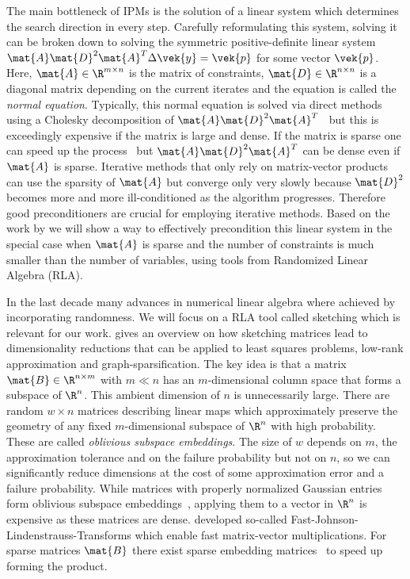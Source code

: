 The main bottleneck of IPMs is the solution of a linear system which determines the search direction in every step.
Carefully reformulating this system, solving it can be broken down to solving the symmetric positive-definite linear system \(\mat{A} \mat{D}^2 \mat{A}^T \Delta \vek{y} = \vek{p}\) for some vector \(\vek{p}\).
Here, \(\mat{A} \in \R^{m \times n}\) is the matrix of constraints, \(\mat{D} \in \R^{n \times n}\) is a diagonal matrix depending on the current iterates and the equation is called the \emph{normal equation}.
Typically, this normal equation is solved via direct methods using a Cholesky decomposition of \(\mat{A} \mat{D}^2 \mat{A}^T\)~\cite[p. 17]{Wright-PrimalDualInteriorPointMethods} but this is exceedingly expensive if the matrix is large and dense.
If the matrix is sparse one can speed up the process~\cite{NgPeyton-SparseCholesky} but \(\mat{A} \mat{D}^2 \mat{A}^T\) can be dense even if \(\mat{A}\) is sparse.
Iterative methods that only rely on matrix-vector products can use the sparsity of \(\mat{A}\) but converge only very slowly because \(\mat{D}^2\) becomes more and more ill-conditioned as the algorithm progresses.
Therefore good preconditioners are crucial for employing iterative methods.
Based on the work by \textcite{Avron-FasterRandomizedInfeasibleIPMs} we will show a way to effectively precondition this linear system in the special case when \(\mat{A}\) is sparse and the number of constraints is much smaller than the number of variables, using tools from Randomized Linear Algebra (RLA).

In the last decade many advances in numerical linear algebra where achieved by incorporating randomness.
We will focus on a RLA tool called sketching which is relevant for our work.
\textcite{Woodruff-Sketching} gives an overview on how sketching matrices lead to dimensionality reductions that can be applied to least squares problems, low-rank approximation and graph-sparsification.
The key idea is that a matrix \(\mat{B} \in \R^{n \times m}\) with \(m \ll n\) has an \(m\)-dimensional column space that forms a subspace of \(\R^n\).
This ambient dimension of \(n\) is unnecessarily large.
There are random \(w \times n\) matrices describing linear maps which approximately preserve the geometry of any fixed \(m\)-dimensional subspace of \(\R^n\) with high probability.
These are called \emph{oblivious subspace embeddings}.
The size of \(w\) depends on \(m\), the approximation tolerance and on the failure probability but not on \(n\), so we can significantly reduce dimensions at the cost of some approximation error and a failure probability.
While matrices with properly normalized Gaussian entries form oblivious subspace embeddings~\cite[Theorem 6]{Woodruff-Sketching}, applying them to a vector in \(\R^n\) is expensive as these matrices are dense.
\textcite{AilonChazelle-FastJohnsonLindenstraussTransform} developed so-called Fast-Johnson-Lindenstrauss-Transforms which enable fast matrix-vector multiplications. For sparse matrices \(\mat{B}\) there exist sparse embedding matrices~\cite{Achlioptas-SparseSketching,Cohen-NearlyTightObliviousSubspaceEmbeddings} to speed up forming the product.

